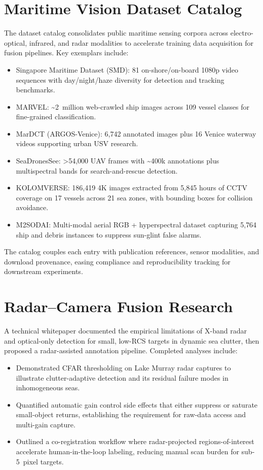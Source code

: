 \documentclass[12pt]{article}
\begin{document}
\section{Maritime Vision Dataset Catalog}
The dataset catalog consolidates public maritime sensing corpora across electro-optical, infrared, and radar modalities to accelerate training data acquisition for fusion pipelines.\cite{maritime-datasets} Key exemplars include:
\begin{itemize}[leftmargin=*,nosep]
  \item Singapore Maritime Dataset (SMD): 81 on-shore/on-board 1080p video sequences with day/night/haze diversity for detection and tracking benchmarks.
  \item MARVEL: \textasciitilde2~million web-crawled ship images across 109 vessel classes for fine-grained classification.
  \item MarDCT (ARGOS-Venice): 6{,}742 annotated images plus 16 Venice waterway videos supporting urban USV research.
  \item SeaDronesSee: >54{,}000 UAV frames with \textasciitilde400k annotations plus multispectral bands for search-and-rescue detection.
  \item KOLOMVERSE: 186{,}419 4K images extracted from 5{,}845 hours of CCTV coverage on 17 vessels across 21 sea zones, with bounding boxes for collision avoidance.
  \item M2SODAI: Multi-modal aerial RGB + hyperspectral dataset capturing 5{,}764 ship and debris instances to suppress sun-glint false alarms.
\end{itemize}
The catalog couples each entry with publication references, sensor modalities, and download provenance, easing compliance and reproducibility tracking for downstream experiments.

\section{Radar--Camera Fusion Research}
A technical whitepaper documented the empirical limitations of X-band radar and optical-only detection for small, low-RCS targets in dynamic sea clutter, then proposed a radar-assisted annotation pipeline.\cite{fusion-summary} Completed analyses include:
\begin{itemize}[leftmargin=*,nosep]
  \item Demonstrated CFAR thresholding on Lake Murray radar captures to illustrate clutter-adaptive detection and its residual failure modes in inhomogeneous seas.
  \item Quantified automatic gain control side effects that either suppress or saturate small-object returns, establishing the requirement for raw-data access and multi-gain capture.
  \item Outlined a co-registration workflow where radar-projected regions-of-interest accelerate human-in-the-loop labeling, reducing manual scan burden for sub-5~pixel targets.
\end{itemize}
\end{document}
